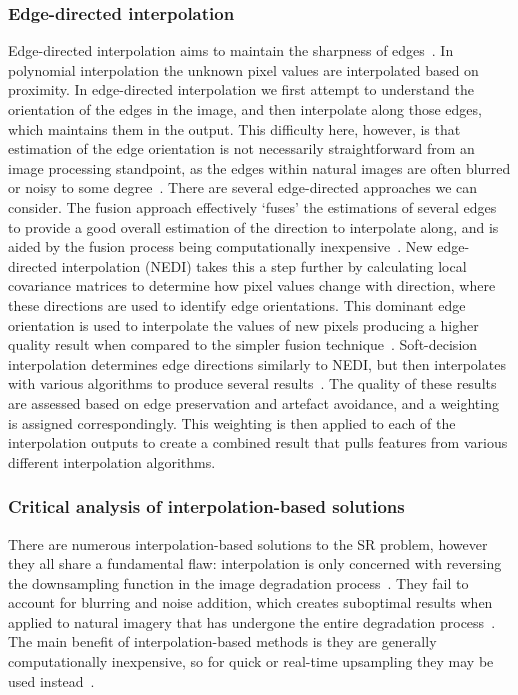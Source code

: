 \subsubsection{Edge-directed interpolation}
Edge-directed interpolation aims to maintain the sharpness of edges~\cite{interpolation}. In polynomial interpolation the unknown pixel values are interpolated based on proximity. In edge-directed interpolation we first attempt to understand the orientation of the edges in the image, and then interpolate along those edges, which maintains them in the output. This difficulty here, however, is that estimation of the edge orientation is not necessarily straightforward from an image processing standpoint, as the edges within natural images are often blurred or noisy to some degree~\cite{interpolation}. There are several edge-directed approaches we can consider. The fusion approach effectively `fuses' the estimations of several edges to provide a good overall estimation of the direction to interpolate along, and is aided by the fusion process being computationally inexpensive~\cite{interpolation}. New edge-directed interpolation (NEDI) takes this a step further by calculating local covariance matrices to determine how pixel values change with direction, where these directions are used to identify edge orientations. This dominant edge orientation is used to interpolate the values of new pixels producing a higher quality result when compared to the simpler fusion technique~\cite{interpolation}. Soft-decision interpolation determines edge directions similarly to NEDI, but then interpolates with various algorithms to produce several results~\cite{interpolation}. The quality of these results are assessed based on edge preservation and artefact avoidance, and a weighting is assigned correspondingly. This weighting is then applied to each of the interpolation outputs to create a combined result that pulls features from various different interpolation algorithms.

\subsubsection{Critical analysis of interpolation-based solutions}
There are numerous interpolation-based solutions to the SR problem, however they all share a fundamental flaw: interpolation is only concerned with reversing the downsampling function in the image degradation process~\cite{interpolation}. They fail to account for blurring and noise addition, which creates suboptimal results when applied to natural imagery that has undergone the entire degradation process~\cite{interpolation}. The main benefit of interpolation-based methods is they are generally computationally inexpensive, so for quick or real-time upsampling they may be used instead~\cite{interpolation}.

